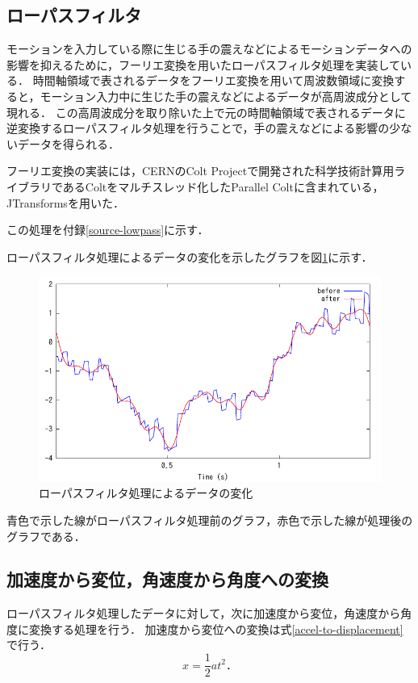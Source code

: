 \subsection{ローパスフィルタ}
モーションを入力している際に生じる手の震えなどによるモーションデータへの影響を抑えるために，フーリエ変換を用いたローパスフィルタ処理を実装している．
時間軸領域で表されるデータをフーリエ変換を用いて周波数領域に変換すると，モーション入力中に生じた手の震えなどによるデータが高周波成分として現れる．
この高周波成分を取り除いた上で元の時間軸領域で表されるデータに逆変換するローパスフィルタ処理を行うことで，手の震えなどによる影響の少ないデータを得られる．

フーリエ変換の実装には，CERNのColt Project\cite{4-colt-project}で開発された科学技術計算用ライブラリであるColtをマルチスレッド化したParallel Colt\cite{4-parallel-colt}に含まれている，JTransforms\cite{4-jtransforms}を用いた．

この処理を付録\ref{source-lowpass}に示す．

ローパスフィルタ処理によるデータの変化を示したグラフを図\ref{graph-lowpass}に示す．

\begin{figure}[hbtp]
  \centering
  \includegraphics[bb=0 0 360 216, width=12cm]{Graphs/lowpass.pdf}
  \caption{ローパスフィルタ処理によるデータの変化}
  \label{graph-lowpass}
\end{figure}

青色で示した線がローパスフィルタ処理前のグラフ，赤色で示した線が処理後のグラフである．

\subsection{加速度から変位，角速度から角度への変換}
ローパスフィルタ処理したデータに対して，次に加速度から変位，角速度から角度に変換する処理を行う．
加速度から変位への変換は式\ref{accel-to-displacement}で行う．
\begin{equation}
\label{accel-to-displacement}
x = \frac{1}{2} a t^2．
\end{equation}

